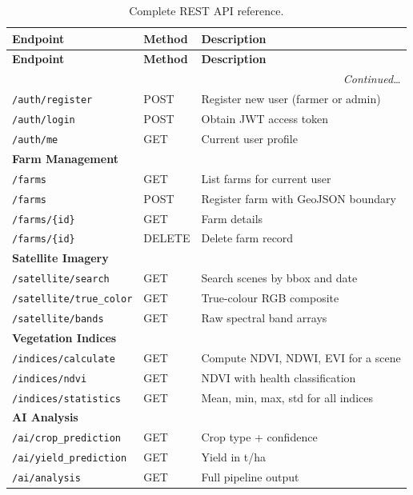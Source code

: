 \documentclass[12pt,a4paper,oneside]{report}
\begin{document}
\begin{longtable}{p{3.8cm}p{1.6cm}p{7.2cm}}
\caption{Complete REST API reference.}\label{tab:api}\\
\toprule\textbf{Endpoint}&\textbf{Method}&\textbf{Description}\\\midrule\endfirsthead
\toprule\textbf{Endpoint}&\textbf{Method}&\textbf{Description}\\\midrule\endhead
\midrule\multicolumn{3}{r}{\textit{Continued\ldots}}\endfoot\bottomrule\endlastfoot
\multicolumn{3}{l}{\textbf{Authentication}}\\
\texttt{/auth/register}        &POST  &Register new user (farmer or admin)\\
\texttt{/auth/login}           &POST  &Obtain JWT access token\\
\texttt{/auth/me}              &GET   &Current user profile\\[4pt]
\multicolumn{3}{l}{\textbf{Farm Management}}\\
\texttt{/farms}                &GET   &List farms for current user\\
\texttt{/farms}                &POST  &Register farm with GeoJSON boundary\\
\texttt{/farms/\{id\}}         &GET   &Farm details\\
\texttt{/farms/\{id\}}         &DELETE&Delete farm record\\[4pt]
\multicolumn{3}{l}{\textbf{Satellite Imagery}}\\
\texttt{/satellite/search}     &GET   &Search scenes by bbox and date\\
\texttt{/satellite/true\_color}&GET   &True-colour RGB composite\\
\texttt{/satellite/bands}      &GET   &Raw spectral band arrays\\[4pt]
\multicolumn{3}{l}{\textbf{Vegetation Indices}}\\
\texttt{/indices/calculate}    &GET   &Compute NDVI, NDWI, EVI for a scene\\
\texttt{/indices/ndvi}         &GET   &NDVI with health classification\\
\texttt{/indices/statistics}   &GET   &Mean, min, max, std for all indices\\[4pt]
\multicolumn{3}{l}{\textbf{AI Analysis}}\\
\texttt{/ai/crop\_prediction}  &GET   &Crop type + confidence\\
\texttt{/ai/yield\_prediction} &GET   &Yield in t/ha\\
\texttt{/ai/analysis}          &GET   &Full pipeline output\\

\end{longtable}
\end{document}
